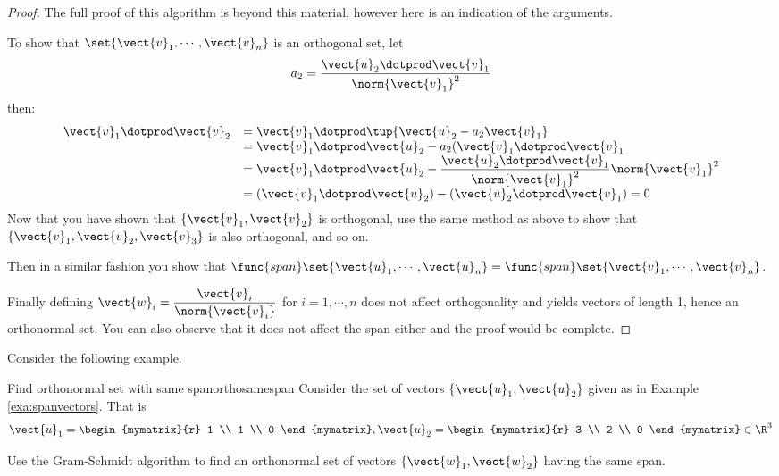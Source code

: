 \begin{proof}
The full proof of this algorithm is beyond this material, however here is an indication of the arguments. 

To show that  $\set{\vect{v}_1,\cdots , \vect{v}_n  } $ is an orthogonal set, let 
\[ a_2 =  \dfrac{ \vect{u}_2 \dotprod \vect{v}_1}{\norm{\vect{v}_1}^2} \]
then: 
\[
\begin{array}{ll}
 \vect{v}_1 \dotprod \vect{v}_2 &  =  \vect{v}_1 \dotprod \tup{\vect{u}_2 - a_2 \vect{v}_1 }  \\
 & = \vect{v}_1 \dotprod \vect{u}_2 - a_2 (\vect{v}_1 \dotprod \vect{v}_1  \\
 & = \vect{v}_1 \dotprod \vect{u}_2 - \dfrac{ \vect{u}_2 \dotprod \vect{v}_1}{\norm{\vect{v}_1}^2} \norm{\vect{v}_1}^2 \\
 & = ( \vect{v}_1 \dotprod \vect{u}_2 ) - ( \vect{u}_2 \dotprod \vect{v}_1 ) =0\\
\end{array}
\]
Now that you have shown that $\{\vect{v}_1, \vect{v}_2\}$ is orthogonal,  use the same method as above to show that 
$\{\vect{v}_1, \vect{v}_2, \vect{v}_3\}$ is also orthogonal,  and so on. 

Then in a similar fashion you show that $\func{span}\set{
\vect{u}_1,\cdots ,\vect{u}_n } = \func{span}\set{
\vect{v}_1,\cdots ,\vect{v}_n }$.

Finally defining $\vect{w}_i =
\dfrac{\vect{v}_i}{\norm{\vect{v}_i}}$ for $i=1, \cdots
,n$ does not affect orthogonality and yields vectors of length 1,
hence an orthonormal set. You can also observe that it does not affect
the span either and the proof would be complete.
\end{proof}

Consider the following example.

\begin{example}{Find orthonormal set with same span}{orthosamespan}
Consider the set of vectors $\{\vect{u}_1, \vect{u}_2\}$ given as in Example \ref{exa:spanvectors}. That is  
\[
\vect{u}_1=\begin{mymatrix}{r}
1 \\
1 \\
0
\end{mymatrix}, \vect{u}_2=\begin{mymatrix}{r}
3 \\
2 \\
0
\end{mymatrix} \in \R^{3} 
\]

Use the Gram-Schmidt algorithm to find an orthonormal set of vectors $\{\vect{w}_1, \vect{w}_2\}$ having the same span.
\end{example}

